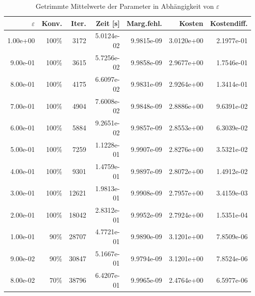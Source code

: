 \begin{table}[htbp]
\caption{Getrimmte Mittelwerte der Parameter in Abhängigkeit von $\varepsilon$}
\label{tab:Parametertest128_tol1e-08}
\small
\centering
{}
\begin{tabular}{rrrrrrr}
\toprule
$\varepsilon$ & Konv. & Iter. & Zeit [s] & Marg.fehl. & Kosten & Kostendiff. \\
\midrule
1.00e+00 & 100\% & 3172 & 5.0124e-02 & 9.9815e-09 & 3.0120e+00 & 2.1977e-01 \\
9.00e-01 & 100\% & 3615 & 5.7256e-02 & 9.9858e-09 & 2.9677e+00 & 1.7546e-01 \\
8.00e-01 & 100\% & 4175 & 6.6097e-02 & 9.9831e-09 & 2.9264e+00 & 1.3414e-01 \\
7.00e-01 & 100\% & 4904 & 7.6008e-02 & 9.9848e-09 & 2.8886e+00 & 9.6391e-02 \\
6.00e-01 & 100\% & 5884 & 9.2651e-02 & 9.9857e-09 & 2.8553e+00 & 6.3039e-02 \\
5.00e-01 & 100\% & 7259 & 1.1228e-01 & 9.9907e-09 & 2.8276e+00 & 3.5321e-02 \\
4.00e-01 & 100\% & 9301 & 1.4759e-01 & 9.9897e-09 & 2.8072e+00 & 1.4912e-02 \\
3.00e-01 & 100\% & 12621 & 1.9813e-01 & 9.9908e-09 & 2.7957e+00 & 3.4159e-03 \\
2.00e-01 & 100\% & 18042 & 2.8312e-01 & 9.9952e-09 & 2.7924e+00 & 1.5351e-04 \\
1.00e-01 & 90\% & 28707 & 4.7721e-01 & 9.9890e-09 & 3.1201e+00 & 7.8509e-06 \\
9.00e-02 & 90\% & 30847 & 5.1667e-01 & 9.9794e-09 & 3.1201e+00 & 7.8524e-06 \\
8.00e-02 & 70\% & 38796 & 6.4207e-01 & 9.9965e-09 & 2.4764e+00 & 6.5977e-06 \\
\bottomrule
\end{tabular}
\end{table}
